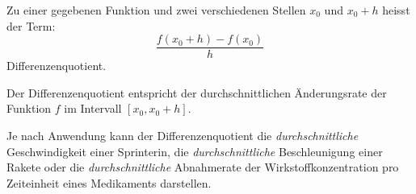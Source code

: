 




\begin{deff}
    [Differenzenquotient]{}
    Zu einer gegebenen Funktion und zwei verschiedenen Stellen $x_0$ und $x_0+h$ heisst der Term:
    \[
        \frac{f(x_0+h)-f(x_0)}{h}
    \]
    Differenzenquotient.


    Der Differenzenquotient entspricht der durchschnittlichen Änderungsrate der Funktion $f$ im Intervall $[x_0, x_0+h]$.
\end{deff}

Je nach Anwendung kann der Differenzenquotient die \emph{durchschnittliche} Geschwindigkeit einer Sprinterin, die \emph{durchschnittliche} Beschleunigung einer Rakete oder die \emph{durchschnittliche} Abnahmerate der Wirkstoffkonzentration pro Zeiteinheit eines Medikaments darstellen.

